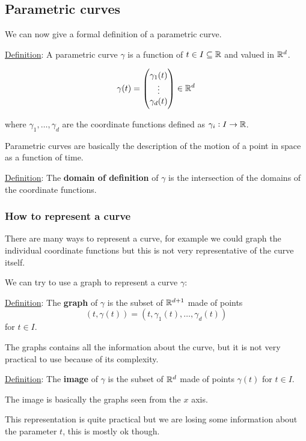 \documentclass[10pt]{extarticle}
\begin{document}

\subsection{Parametric curves}

We can now give a formal definition of a parametric curve.

\underline{Definition}: A parametric curve $\gamma$ is a function of $t \in I \subseteq \mathbb{R}$ and valued in $\mathbb{R}^d$.

$$
    \gamma(t) = \begin{pmatrix}
        \gamma_1(t) \\
        \vdots      \\
        \gamma_d(t)
    \end{pmatrix} \in \mathbb{R}^d
$$

where $\gamma_1, \ldots, \gamma_d$ are the coordinate functions defined as $\gamma_i: I \to \mathbb{R}$.

Parametric curves are basically the description of the motion of a point in space as a function of time.

\underline{Definition}: The \textbf{domain of definition} of $\gamma$ is the intersection of the domains of the coordinate functions.

\subsubsection{How to represent a curve}

There are many ways to represent a curve, for example we could graph the individual coordinate functions but this is not very representative of the curve itself.

We can try to use a graph to represent a curve $\gamma$:

\underline{Definition}: The \textbf{graph} of $\gamma$ is the subset of $\mathbb{R}^{d+1}$ made of points
$$
    (t, \gamma(t)) = (t, \gamma_1(t), \ldots, \gamma_d(t))
$$
for $t \in I$.

The graphs contains all the information about the curve, but it is not very practical to use because of its complexity.

\underline{Definition}: The \textbf{image} of $\gamma$ is the subset of $\mathbb{R}^d$ made of points $\gamma(t)$ for $t \in I$.

The image is basically the graphs seen from the $x$ axis.

This representation is quite practical but we are losing some information about the parameter $t$, this is mostly ok though.
\end{document}
